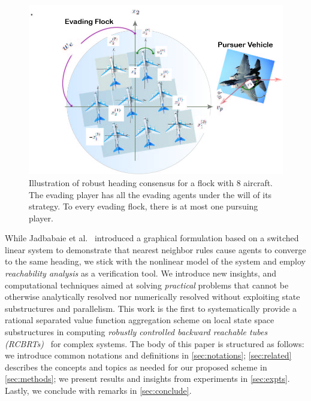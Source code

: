 \begin{figure}[tb!]
	\centering
	\includegraphics[width=\columnwidth]{figures/flock_pursuer.jpg}
	\caption{Illustration of robust heading consensus for a flock with 8 aircraft. The evading player has all the evading agents under the will of its strategy.  To every evading flock, there is at most one pursuing player. }
	\label{fig:robust_heading}
\end{figure}
%
While Jadbabaie et al.~\cite{JadbabaieCoord} introduced a graphical formulation based on a switched linear system to demonstrate that nearest neighbor rules cause agents to converge to the same heading, we stick with the nonlinear model of the system and employ \textit{reachability analysis} as a verification tool.  We introduce new insights, and computational techniques aimed at solving \textit{practical} problems that cannot be otherwise analytically resolved nor numerically resolved without exploiting state substructures and parallelism. This work is the first to systematically provide a rational separated value function aggregation  scheme on local state space substructures in computing \textit{robustly controlled backward reachable tubes  (RCBRTs)}~\cite{Mitchell2020} for complex systems. The body of this paper is structured as follows: we introduce common notations and definitions in \autoref{sec:notations}; \autoref{sec:related} describes the concepts and topics as needed for our proposed scheme in \autoref{sec:methods}; we present results and insights from experiments in \autoref{sec:expts}. Lastly, we  conclude with remarks in \autoref{sec:conclude}.  